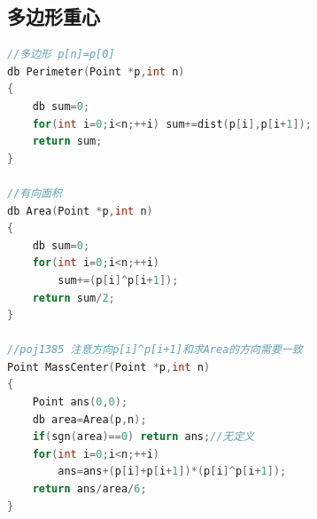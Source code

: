 \documentclass[UTF8,a4paper,titlepage]{ctexart}
\begin{document}
\subsection{多边形重心}

\begin{lstlisting}[language=C++]
//多边形 p[n]=p[0]
db Perimeter(Point *p,int n)
{
    db sum=0;
    for(int i=0;i<n;++i) sum+=dist(p[i],p[i+1]);
    return sum;
}

//有向面积
db Area(Point *p,int n)
{
    db sum=0;
    for(int i=0;i<n;++i)
        sum+=(p[i]^p[i+1]);
    return sum/2;
}

//poj1385 注意方向p[i]^p[i+1]和求Area的方向需要一致
Point MassCenter(Point *p,int n)
{
    Point ans(0,0);
    db area=Area(p,n);
    if(sgn(area)==0) return ans;//无定义
    for(int i=0;i<n;++i)
        ans=ans+(p[i]+p[i+1])*(p[i]^p[i+1]);
    return ans/area/6;
}
\end{lstlisting}
\end{document}
